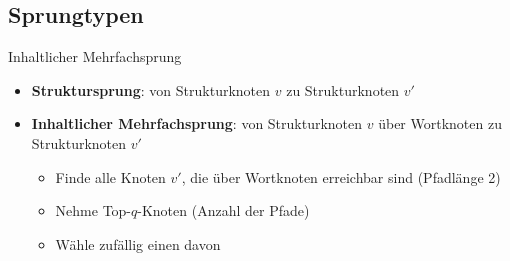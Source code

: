 \subsection{Sprungtypen}
\begin{frame}{Inhaltlicher Mehrfachsprung}
    \begin{itemize}
        \item<1-> \textbf{Struktursprung}: von Strukturknoten $v$ zu Strukturknoten $v'$
        \item<2-> \textbf{Inhaltlicher Mehrfachsprung}: von Strukturknoten $v$ über Wortknoten zu Strukturknoten $v'$
        \begin{itemize}
            \item<3-> Finde alle Knoten $v'$, die über Wortknoten erreichbar sind (Pfadlänge 2)
            \item<4-> Nehme Top-$q$-Knoten (Anzahl der Pfade)
            \item<5-> Wähle zufällig einen davon
        \end{itemize}
    \end{itemize}
\end{frame}
